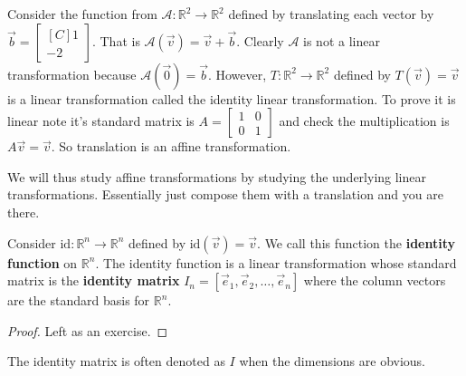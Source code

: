 \begin{example} Consider the function from $\mathcal{A}:\mathbb{R}^2 \to \mathbb{R}^2$ defined by translating each vector by 
$\vec{b}=\begin{bmatrix*}[C] 1 \\ -2 \end{bmatrix*}$. That is $\mathcal{A}(\vec{v})=\vec{v}+\vec{b}$. Clearly $\mathcal{A}$ is not a linear transformation
because $\mathcal{A}(\vec{0})=\vec{b}$. However, $T:\mathbb{R}^2 \to \mathbb{R}^2$ defined by $T(\vec{v})=\vec{v}$ is a linear transformation 
called the identity linear transformation. To prove it is linear note it's standard matrix is $A=\begin{bmatrix} 1 & 0 \\ 0 & 1 \end{bmatrix}$ and check the multiplication is $A\vec{v}=\vec{v}$. So translation is an affine transformation.
\end{example}

\begin{remark}
We will thus study affine transformations by studying the underlying linear transformations. Essentially just compose them with a translation and you are there.
\end{remark}

\begin{proposition}
Consider $\text{id}:\mathbb{R}^n \to \mathbb{R}^n$ defined by $\text{id}(\vec{v})=\vec{v}$. We call this function the \textbf{identity function} on $\mathbb{R}^n$. The identity function is a linear transformation whose standard matrix is the \textbf{identity matrix} $I_n=[\vec{e}_1, \vec{e}_2, \ldots, \vec{e}_n]$ where the column vectors are the standard basis for $\mathbb{R}^n$.
\end{proposition}
\begin{proof}
Left as an exercise.
\end{proof}

\begin{remark}The identity matrix is often denoted as $I$ when the dimensions are obvious.
\end{remark}

